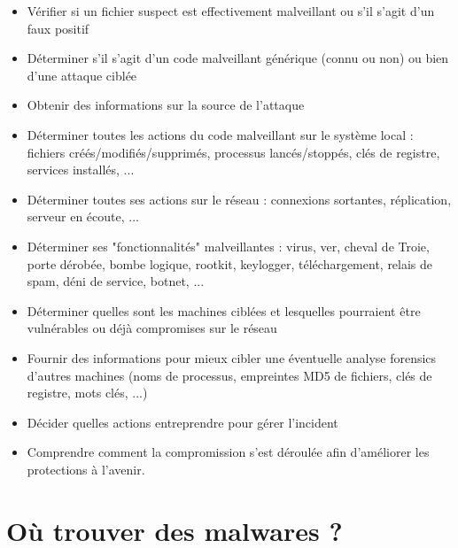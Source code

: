 \begin{itemize}
\item Vérifier si un fichier suspect est effectivement malveillant ou s'il s'agit d'un faux positif
\item Déterminer s'il s'agit d'un code malveillant générique (connu ou non) ou bien d'une attaque ciblée
\item Obtenir des informations sur la source de l'attaque
\item Déterminer toutes les actions du code malveillant sur le système local : fichiers créés/modifiés/supprimés, processus lancés/stoppés, clés de registre, services installés, ...
\item Déterminer toutes ses actions sur le réseau : connexions sortantes, réplication, serveur en écoute, ...
\item Déterminer ses "fonctionnalités" malveillantes : virus, ver, cheval de Troie, porte dérobée, bombe logique, rootkit, keylogger, téléchargement, relais de spam, déni de service, botnet, ...
\item Déterminer quelles sont les machines ciblées et lesquelles pourraient être vulnérables ou déjà compromises sur le réseau
\item Fournir des informations pour mieux cibler une éventuelle analyse forensics d'autres machines (noms de processus, empreintes MD5 de fichiers, clés de registre, mots clés, ...)
\item Décider quelles actions entreprendre pour gérer l'incident
\item Comprendre comment la compromission s'est déroulée afin d'améliorer les protections à l'avenir.\\
\end{itemize}

\section{Où trouver des malwares ?}

